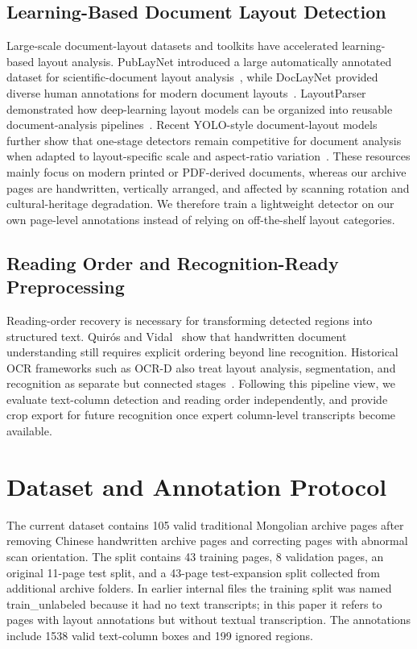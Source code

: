 \documentclass[12pt]{article}
\begin{document}
\subsection{Learning-Based Document Layout Detection}
Large-scale document-layout datasets and toolkits have accelerated learning-based layout analysis. PubLayNet introduced a large automatically annotated dataset for scientific-document layout analysis~\cite{zhong2019publaynet}, while DocLayNet provided diverse human annotations for modern document layouts~\cite{pfitzmann2022doclaynet}. LayoutParser demonstrated how deep-learning layout models can be organized into reusable document-analysis pipelines~\cite{shen2021layoutparser}. Recent YOLO-style document-layout models further show that one-stage detectors remain competitive for document analysis when adapted to layout-specific scale and aspect-ratio variation~\cite{deng2023yolo, zhao2024doclayout}. These resources mainly focus on modern printed or PDF-derived documents, whereas our archive pages are handwritten, vertically arranged, and affected by scanning rotation and cultural-heritage degradation. We therefore train a lightweight detector on our own page-level annotations instead of relying on off-the-shelf layout categories.

\subsection{Reading Order and Recognition-Ready Preprocessing}
Reading-order recovery is necessary for transforming detected regions into structured text. Quir\'os and Vidal~\cite{quiros2022reading} show that handwritten document understanding still requires explicit ordering beyond line recognition. Historical OCR frameworks such as OCR-D also treat layout analysis, segmentation, and recognition as separate but connected stages~\cite{neudecker2019ocrd}. Following this pipeline view, we evaluate text-column detection and reading order independently, and provide crop export for future recognition once expert column-level transcripts become available.

\section{Dataset and Annotation Protocol}
The current dataset contains 105 valid traditional Mongolian archive pages after removing Chinese handwritten archive pages and correcting pages with abnormal scan orientation. The split contains 43 training pages, 8 validation pages, an original 11-page test split, and a 43-page test-expansion split collected from additional archive folders. In earlier internal files the training split was named train\_unlabeled because it had no text transcripts; in this paper it refers to pages with layout annotations but without textual transcription. The annotations include 1538 valid text-column boxes and 199 ignored regions.
\end{document}
